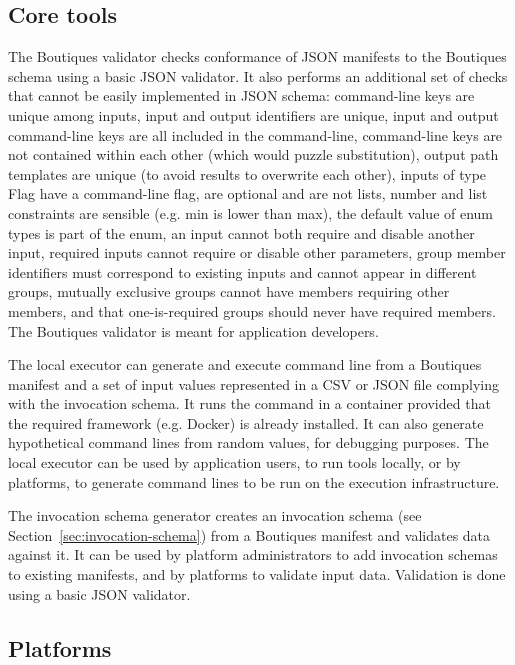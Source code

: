 \documentclass{article}
\begin{document}
\subsection{Core tools} 

The Boutiques validator checks conformance of JSON manifests to the
Boutiques schema using a basic JSON validator. It also performs an
additional set of checks that cannot be easily implemented in JSON
schema: command-line keys are unique among inputs, input and output
identifiers are unique, input and output command-line keys are all
included in the command-line, command-line keys are not contained
within each other (which would puzzle substitution), output path
templates are unique (to avoid results to overwrite each other),
inputs of type Flag have a command-line flag, are optional and are not
lists, number and list constraints are sensible (e.g. min is lower
than max), the default value of enum types is part of the enum, an
input cannot both require and disable another input, required inputs
cannot require or disable other parameters, group member identifiers
must correspond to existing inputs and cannot appear in different
groups, mutually exclusive groups cannot have members requiring other
members, and that one-is-required groups should never have required
members. The Boutiques validator is meant for application developers.

The local executor can generate and execute command line from a
Boutiques manifest and a set of input values represented in a CSV or
JSON file complying with the invocation schema. It runs the
command in a container provided that the required framework
(e.g. Docker) is already installed. It can also generate hypothetical
command lines from random values, for debugging purposes. The local
executor can be used by application users, to run tools locally, or by
platforms, to generate command lines to be run on the execution
infrastructure.

The invocation schema generator creates an invocation schema (see
Section~\ref{sec:invocation-schema}) from a Boutiques manifest and
validates data against it. It can be used by platform administrators
to add invocation schemas to existing manifests, and by platforms to
validate input data. Validation is done using a basic JSON
validator.

\subsection{Platforms}
\end{document}
